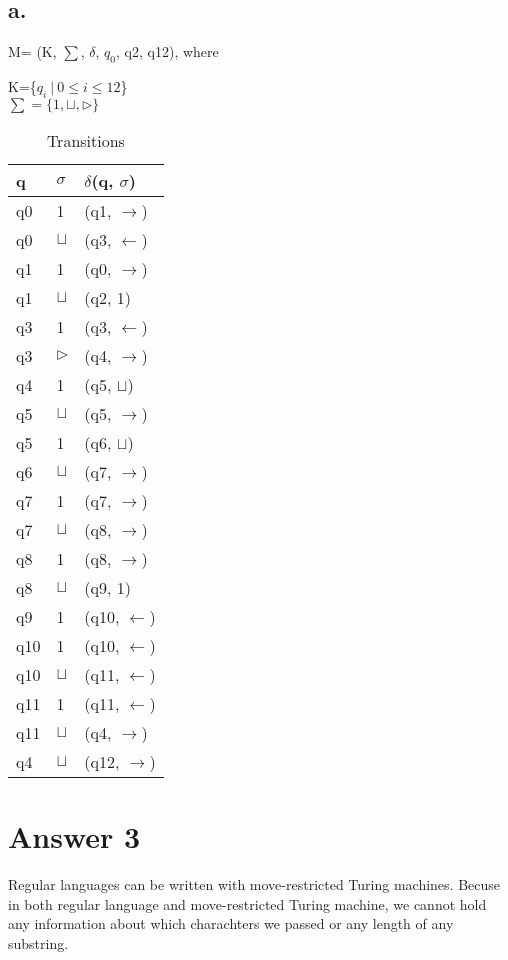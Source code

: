 \documentclass[12pt]{article}
\begin{document}
\subsection*{a.}
M= (K, $\sum$, $\delta$, $q_0$, {q2, q12}), where
\begin{center}
    K=\{$q_i\ |\ 0 \le i \le 12$\}\\
    $\sum = \{1, \sqcup, \triangleright \}$
\end{center}

\begin{table}[H]
\centering
\caption{Transitions}
\label{my-label}
\begin{tabular}{|l|l|l|}
\hline
q & $\sigma$ & $\delta$(q, $\sigma$) \\ \hline
q0 & 1 & (q1, $\rightarrow$) \\ \hline
q0 & $\sqcup$ & (q3, $\leftarrow$) \\ \hline
q1 & 1 & (q0, $\rightarrow$) \\ \hline
q1 & $\sqcup$ & (q2, 1) \\ \hline
q3 & 1 & (q3, $\leftarrow$) \\ \hline
q3 & $\triangleright$ & (q4, $\rightarrow$) \\ \hline
q4 & 1 & (q5, $\sqcup$) \\ \hline
q5 & $\sqcup$ & (q5, $\rightarrow$) \\ \hline
q5 & 1 & (q6, $\sqcup$) \\ \hline
q6 & $\sqcup$ & (q7, $\rightarrow$) \\ \hline
q7 & 1 & (q7, $\rightarrow$) \\ \hline
q7 & $\sqcup$ & (q8, $\rightarrow$) \\ \hline
q8 & 1 & (q8, $\rightarrow$) \\ \hline
q8 & $\sqcup$ & (q9, 1) \\ \hline
q9 & 1 & (q10, $\leftarrow$) \\ \hline
q10 & 1 & (q10, $\leftarrow$) \\ \hline
q10 & $\sqcup$ & (q11, $\leftarrow$) \\ \hline
q11 & 1 & (q11, $\leftarrow$) \\ \hline
q11 & $\sqcup$ & (q4, $\rightarrow$) \\ \hline
q4 & $\sqcup$ & (q12, $\rightarrow$) \\ \hline
\end{tabular}
\end{table}


\section*{Answer 3}
Regular languages can be written with move-restricted Turing machines. Becuse in both regular language and move-restricted Turing machine, we cannot hold any information about which charachters we passed or any length of any substring. 
\end{document}
